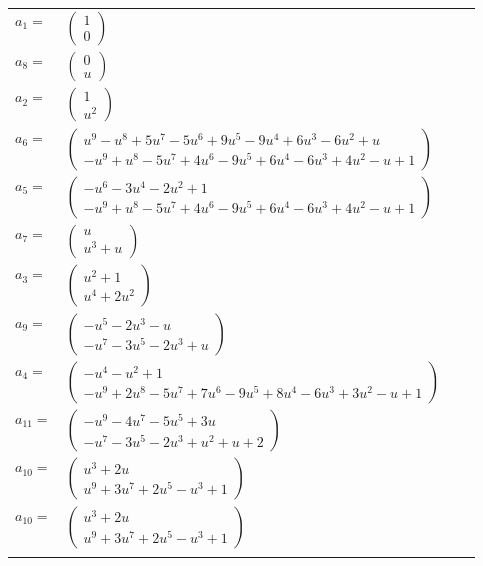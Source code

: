 \documentclass[1p]{elsarticle_modified}
\theoremstyle{definition}
\begin{document}
\begin{tabular}{m{7pt} m{180pt} m{7pt} m{180pt} }
\flushright $a_{1}=$&$\begin{pmatrix}1\\0\end{pmatrix}$ \\
\flushright $a_{8}=$&$\begin{pmatrix}0\\u\end{pmatrix}$ \\
\flushright $a_{2}=$&$\begin{pmatrix}1\\u^2\end{pmatrix}$ \\
\flushright $a_{6}=$&$\begin{pmatrix}u^9- u^8+5 u^7-5 u^6+9 u^5-9 u^4+6 u^3-6 u^2+u\\- u^9+u^8-5 u^7+4 u^6-9 u^5+6 u^4-6 u^3+4 u^2- u+1\end{pmatrix}$ \\
\flushright $a_{5}=$&$\begin{pmatrix}- u^6-3 u^4-2 u^2+1\\- u^9+u^8-5 u^7+4 u^6-9 u^5+6 u^4-6 u^3+4 u^2- u+1\end{pmatrix}$ \\
\flushright $a_{7}=$&$\begin{pmatrix}u\\u^3+u\end{pmatrix}$ \\
\flushright $a_{3}=$&$\begin{pmatrix}u^2+1\\u^4+2 u^2\end{pmatrix}$ \\
\flushright $a_{9}=$&$\begin{pmatrix}- u^5-2 u^3- u\\- u^7-3 u^5-2 u^3+u\end{pmatrix}$ \\
\flushright $a_{4}=$&$\begin{pmatrix}- u^4- u^2+1\\- u^9+2 u^8-5 u^7+7 u^6-9 u^5+8 u^4-6 u^3+3 u^2- u+1\end{pmatrix}$ \\
\flushright $a_{11}=$&$\begin{pmatrix}- u^9-4 u^7-5 u^5+3 u\\- u^7-3 u^5-2 u^3+u^2+u+2\end{pmatrix}$ \\
\flushright $a_{10}=$&$\begin{pmatrix}u^3+2 u\\u^9+3 u^7+2 u^5- u^3+1\end{pmatrix}$\\ \flushright $a_{10}=$&$\begin{pmatrix}u^3+2 u\\u^9+3 u^7+2 u^5- u^3+1\end{pmatrix}$\\&\end{tabular}
\end{document}
